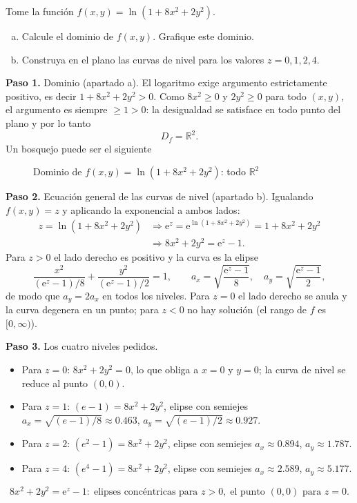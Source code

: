 \begin{prob}
Tome la función $f(x,y)=\ln\left(1+8x^2+2y^2\right).$
\begin{enumerate}[(a)]
    \item Calcule el dominio de $f(x,y).$ Grafique este dominio.
    \item Construya en el plano las curvas de nivel para los valores $z=0,1,2,4.$
\end{enumerate}
\begin{myproof}
\textbf{Paso 1.} Dominio (apartado a). El logaritmo exige argumento
estrictamente positivo, es decir $1+8x^2+2y^2>0.$ Como $8x^2\geq 0$ y
$2y^2\geq 0$ para todo $(x,y)$, el argumento es siempre $\geq 1>0$: la
desigualdad se satisface en todo punto del plano y por lo tanto
\[
  \boxed{D_f=\mathbb{R}^2.}
\]
Un bosquejo puede ser el siguiente
\begin{figure}[H]
\centering
{}
\caption{Dominio de $f(x,y)=\ln(1+8x^2+2y^2)$: todo $\mathbb{R}^2$}
\label{fig:dom_ln_8x2_2y2}
\end{figure}
\textbf{Paso 2.} Ecuación general de las curvas de nivel (apartado b). Igualando
$f(x,y)=z$ y aplicando la exponencial a ambos lados:
\begin{align*}
z=\ln\left( 1+8x^2+2y^2 \right)
&\Rightarrow \mathrm{e}^{z}=\mathrm{e}^{\ln\left( 1+8x^2+2y^2 \right)}=1+8x^2+2y^2\\
&\Rightarrow 8x^2+2y^2=\mathrm{e}^{z}-1.
\end{align*}
Para $z>0$ el lado derecho es positivo y la curva es la elipse
\[
  \frac{x^2}{(\mathrm{e}^{z}-1)/8}+\frac{y^2}{(\mathrm{e}^{z}-1)/2}=1,
  \qquad a_x=\sqrt{\frac{\mathrm{e}^{z}-1}{8}},\quad a_y=\sqrt{\frac{\mathrm{e}^{z}-1}{2}},
\]
de modo que $a_y=2a_x$ en todos los niveles. Para $z=0$ el lado derecho se anula
y la curva degenera en un punto; para $z<0$ no hay solución (el rango de $f$ es
$[0,\infty)$).

\textbf{Paso 3.} Los cuatro niveles pedidos.
\begin{itemize}
\item Para $z=0$: $8x^2+2y^2=0$, lo que obliga a $x=0$ y $y=0$; la curva de nivel se reduce al punto $(0,0).$
\item Para $z=1$: $(e-1) = 8x^2+2y^2$, elipse con semiejes $a_x=\sqrt{(e-1)/8}\approx 0.463$, $a_y=\sqrt{(e-1)/2}\approx 0.927$.
\item Para $z=2$: $(e^2-1) = 8x^2+2y^2$, elipse con semiejes $a_x\approx 0.894$, $a_y\approx 1.787$.
\item Para $z=4$: $(e^4-1) = 8x^2+2y^2$, elipse con semiejes $a_x\approx 2.589$, $a_y\approx 5.177$.
\end{itemize}
\[
  \boxed{8x^2+2y^2=\mathrm{e}^{z}-1:\;\text{elipses concéntricas para }z>0,\;
  \text{el punto }(0,0)\text{ para }z=0.}
\]


\end{myproof}
\end{prob}

